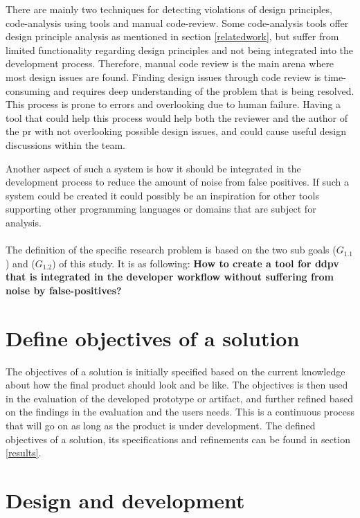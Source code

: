 \documentclass{report}
\begin{document}
There are mainly two techniques for detecting violations of design principles, code-analysis using tools and manual code-review. Some code-analysis tools offer design principle analysis as mentioned in section \ref{relatedwork}, but suffer from limited functionality regarding design principles and not being integrated into the development process. Therefore, manual code review is the main arena where most design issues are found. Finding design issues through code review is time-consuming and requires deep understanding of the problem that is being resolved. This process is prone to errors and overlooking due to human failure. Having a tool that could help this process would help both the reviewer and the author of the \gls{pr} with not overlooking possible design issues, and could cause useful design discussions within the team.

Another aspect of such a system is how it should be integrated in the development process to reduce the amount of noise from false positives. If such a system could be created it could possibly be an inspiration for other tools supporting other programming languages or domains that are subject for analysis. \\

\\ The definition of the specific research problem is based on the two sub goals (\(G_{1.1}\)) and (\(G_{1.2}\)) of this study. It is as following: \textbf{How to create a tool for \gls{ddpv} that is integrated in the developer workflow without suffering from noise by false-positives?}

\section{Define objectives of a solution}
\label{objectives-of-solution}
The objectives of a solution is initially specified based on the current knowledge about how the final product should look and be like. The objectives is then used in the evaluation of the developed prototype or artifact, and further refined based on the findings in the evaluation and the users needs. This is a continuous process that will go on as long as the product is under development. The defined objectives of a solution, its specifications and refinements can be found in section \ref{results}.

\section{Design and development}
\label{design-development}
\end{document}
